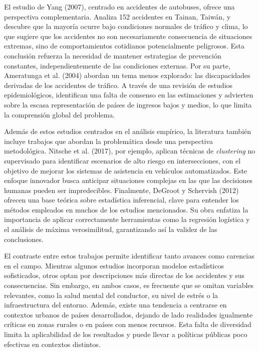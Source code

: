 \documentclass{book}
\begin{document}
El estudio de Yang (2007), centrado en accidentes de autobuses, ofrece una perspectiva complementaria. Analiza 152 accidentes en Tainan, Taiwán, y descubre que la mayoría ocurre bajo condiciones normales de tráfico y clima, lo que sugiere que los accidentes no son necesariamente consecuencia de situaciones extremas, sino de comportamientos cotidianos potencialmente peligrosos. Esta conclusión refuerza la necesidad de mantener estrategias de prevención constantes, independientemente de las condiciones externas. Por su parte, Ameratunga et al. (2004) abordan un tema menos explorado: las discapacidades derivadas de los accidentes de tráfico. A través de una revisión de estudios epidemiológicos, identifican una falta de consenso en las estimaciones y advierten sobre la escasa representación de países de ingresos bajos y medios, lo que limita la comprensión global del problema.

Además de estos estudios centrados en el análisis empírico, la literatura también incluye trabajos que abordan la problemática desde una perspectiva metodológica. Nitsche et al. (2017), por ejemplo, aplican técnicas de \textit{clustering} no supervisado para identificar escenarios de alto riesgo en intersecciones, con el objetivo de mejorar los sistemas de asistencia en vehículos automatizados. Este enfoque innovador busca anticipar situaciones complejas en las que las decisiones humanas pueden ser impredecibles. Finalmente, DeGroot y Schervish (2012) ofrecen una base teórica sobre estadística inferencial, clave para entender los métodos empleados en muchos de los estudios mencionados. Su obra enfatiza la importancia de aplicar correctamente herramientas como la regresión logística y el análisis de máxima verosimilitud, garantizando así la validez de las conclusiones.

El contraste entre estos trabajos permite identificar tanto avances como carencias en el campo. Mientras algunos estudios incorporan modelos estadísticos sofisticados, otros optan por descripciones más directas de los accidentes y sus consecuencias. Sin embargo, en ambos casos, es frecuente que se omitan variables relevantes, como la salud mental del conductor, su nivel de estrés o la infraestructura del entorno. Además, existe una tendencia a centrarse en contextos urbanos de países desarrollados, dejando de lado realidades igualmente críticas en zonas rurales o en países con menos recursos. Esta falta de diversidad limita la aplicabilidad de los resultados y puede llevar a políticas públicas poco efectivas en contextos distintos.
\end{document}
